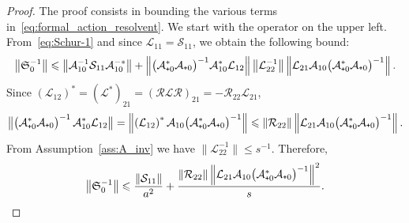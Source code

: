 \documentclass[10pt]{amsart}
\theoremstyle{definition}\newtheorem{defi}[theo]{Definition}\newtheorem{rema}[theo]{Remark}\newtheorem{exam}[theo]{Example}\newtheorem{exem}[theo]{Example}\newtheorem{nota}[theo]{Notation}
\newcommand{\cL}{\mathcal{L}}
\newcommand{\cLs}{\mathcal{S}}
\newcommand{\cLa}{\mathcal{A}}
\newcommand{\cR}{\mathcal{R}}
\newcommand{\Schur}{\mathfrak{S}_0}
\newcommand{\subplus}{\textnormal{\texttt{+}}}
\renewcommand{\leq}{\leqslant}
\renewcommand{\le}{\leqslant}
\begin{document}
\begin{proof}
The proof consists in bounding the various terms in~\eqref{eq:formal_action_resolvent}. We start with the operator on the upper left. From~\eqref{eq:Schur-1} and since $\cL_{11} = \cLs_{11}$, we obtain the following bound:
\[
\left\|\Schur^{-1}\right\| \le \left\|\cLa_{10}^{-1} \cLs_{11} \cLa_{10}^{-*}\right\| + \left\|\big(\cLa_{\subplus0}^*\cLa_{\subplus0}\big)^{-1} \cLa_{10}^{*}\cL_{12} \right\|\left\|\cL_{22}^{-1} \right\|\left\|\cL_{21} \cLa_{10} \big(\cLa_{\subplus0}^*\cLa_{\subplus0}\big)^{-1}\right\|.
\]
Since $(\cL_{12})^{*} = (\cL^{*})_{21} = (\cR \cL \cR)_{21} = -\cR_{22} \cL_{21}$,
\[
\left\|\big(\cLa_{\subplus0}^*\cLa_{\subplus0}\right)^{-1} \cLa_{10}^{*}\cL_{12} \big\| = \left\|\left(\cL_{12}\right)^* \cLa_{10} \big(\cLa_{\subplus0}^*\cLa_{\subplus0}\big)^{-1} \right\|
\leq \|\cR_{22}\|\left\|\cL_{21} \cLa_{10} \big(\cLa_{\subplus0}^*\cLa_{\subplus0}\big)^{-1}\right\|.
\]
From Assumption~\ref{ass:A_inv} we have $\|\cL_{22}^{-1}\| \leq s^{-1}$. Therefore,
\begin{equation}\label{eq:Schur_inv_bound}
\left\|\Schur^{-1}\right\| \le \frac {\left\|\cLs_{11}\right\|} {a^{2}} + \frac {\left\|\cR_{22}\right\|\left\|\cL_{21} \cLa_{10}\big(\cLa_{\subplus0}^{*}\cLa_{\subplus0}\big)^{-1}\right\|^{2}}{s}.
\end{equation}


\end{proof}
\end{document}
